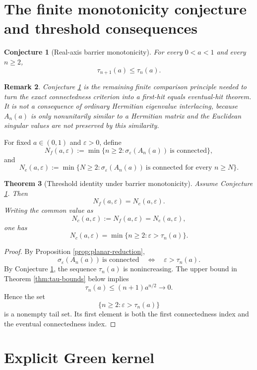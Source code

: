 \documentclass[11pt]{amsart}
\numberwithin{equation}{section}
\newcommand{\eps}{\varepsilon}
\newtheorem{theorem}{Theorem}[section]
\newtheorem{conjecture}[theorem]{Conjecture}
\newtheorem{remark}[theorem]{Remark}
\begin{document}
\section{The finite monotonicity conjecture and threshold consequences}

\begin{conjecture}[Real-axis barrier monotonicity]\label{conj:barrier}
For every \(0<a<1\) and every \(n\ge2\),
\[
\tau_{n+1}(a)\le\tau_n(a).
\]
\end{conjecture}

\begin{remark}
Conjecture \ref{conj:barrier} is the remaining finite comparison principle needed to turn the exact connectedness criterion into a first-hit equals eventual-hit theorem.  It is not a consequence of ordinary Hermitian eigenvalue interlacing, because \(A_n(a)\) is only nonunitarily similar to a Hermitian matrix and the Euclidean singular values are not preserved by this similarity.
\end{remark}

For fixed \(a\in(0,1)\) and \(\eps>0\), define
\[
N_f(a,\eps)
:=
\min\{n\ge2:\sigma_\eps(A_n(a))\ \text{is connected}\},
\]
and
\[
N_e(a,\eps)
:=
\min\{N\ge2:\sigma_\eps(A_n(a))\ \text{is connected for every }n\ge N\}.
\]

\begin{theorem}[Threshold identity under barrier monotonicity]\label{thm:conditional-threshold}
Assume Conjecture \ref{conj:barrier}.  Then
\[
N_f(a,\eps)=N_e(a,\eps).
\]
Writing the common value as
\[
N_c(a,\eps):=N_f(a,\eps)=N_e(a,\eps),
\]
one has
\[
N_c(a,\eps)
=
\min\{n\ge2:\eps>\tau_n(a)\}.
\]
\end{theorem}

\begin{proof}
By Proposition \ref{prop:planar-reduction},
\[
\sigma_\eps(A_n(a))\ \text{is connected}
\quad\Longleftrightarrow\quad
\eps>\tau_n(a).
\]
By Conjecture \ref{conj:barrier}, the sequence \(\tau_n(a)\) is nonincreasing.  The upper bound in Theorem \ref{thm:tau-bounds} below implies
\[
\tau_n(a)\le(n+1)a^{n/2}\to0.
\]
Hence the set
\[
\{n\ge2:\eps>\tau_n(a)\}
\]
is a nonempty tail set.  Its first element is both the first connectedness index and the eventual connectedness index.
\end{proof}

\section{Explicit Green kernel}
\end{document}
